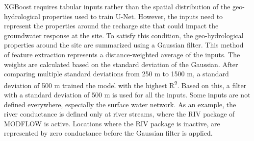 \documentclass[
]{agujournal2019}
\begin{document}
XGBoost requires tabular inputs rather than the spatial distribution of
the geo-hydrological properties used to train U-Net. However, the inputs
need to represent the properties around the recharge site that could
impact the groundwater response at the site. To satisfy this condition,
the geo-hydrological properties around the site are summarized using a
Gaussian filter. This method of feature extraction represents a
distance-weighted average of the inputs. The weights are calculated
based on the standard deviation of the Gaussian. After comparing
multiple standard deviations from 250 m to 1500 m, a standard deviation
of 500 m trained the model with the highest R\textsuperscript{2}. Based
on this, a filter with a standard deviation of 500 m is used for all the
inputs. Some inputs are not defined everywhere, especially the surface
water network. As an example, the river conductance is defined only at
river streams, where the RIV package of MODFLOW is active. Locations
where the RIV package is inactive, are represented by zero conductance
before the Gaussian filter is applied.
\end{document}
